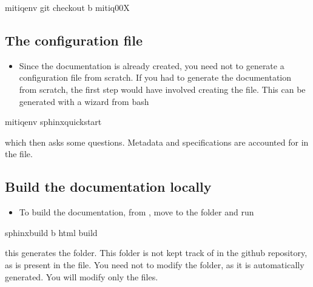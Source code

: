 \documentclass[letterpaper,10pt,english]{sphinxmanual}
\begin{document}
\begin{sphinxVerbatim}[commandchars=\\\{\}]
mitiqenv git checkout \PYGZhy{}b mitiq00X
\end{sphinxVerbatim}


\subsection{The configuration file}
\label{\detokenize{toc-README-docs:the-configuration-file}}\begin{itemize}
\item {} 
Since the documentation is already created, you need not to generate a
configuration file from scratch. If you had to generate the documentation
from scratch, the first step would have involved creating the  file.
This can be generated with a wizard from bash

\end{itemize}

\begin{sphinxVerbatim}[commandchars=\\\{\}]
mitiqenv sphinx\PYGZhy{}quickstart
\end{sphinxVerbatim}

which then asks some questions. Meta\sphinxhyphen{}data and specifications are accounted for
in the  file.


\subsection{Build the documentation locally}
\label{\detokenize{toc-README-docs:build-the-documentation-locally}}\begin{itemize}
\item {} 
To build the documentation, from , move to the  folder and run

\end{itemize}

\begin{sphinxVerbatim}[commandchars=\\\{\}]
sphinx\PYGZhy{}build \PYGZhy{}b html  build
\end{sphinxVerbatim}

this generates the  folder. This folder is not kept track of in the
github repository, as  is present in the  file.
You need not to modify the  folder, as it is automatically
generated. You will modify only the  files.
\end{document}
